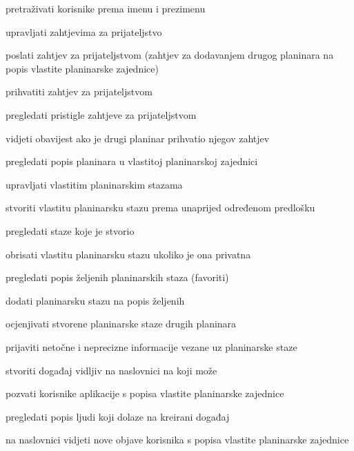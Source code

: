 \begin{packed_enum}
\begin{packed_enum}
\begin{packed_enum}
						\end{packed_enum}
					\item pretraživati korisnike prema imenu i prezimenu
					\item upravljati zahtjevima za prijateljstvo
					
						\begin{packed_enum}
							\item poslati zahtjev za prijateljstvom (zahtjev za dodavanjem drugog planinara na popis vlastite planinarske zajednice)
							\item prihvatiti zahtjev za prijateljstvom
							\item pregledati pristigle zahtjeve za prijateljstvom
							\item vidjeti obavijest ako je drugi planinar prihvatio njegov zahtjev
						\end{packed_enum}
					
					\item pregledati popis planinara u vlastitoj planinarskoj zajednici
					\item upravljati vlastitim planinarskim stazama
					\begin{packed_enum}
						\item stvoriti vlastitu planinarsku stazu prema unaprijed određenom predlošku
						\item pregledati staze koje je stvorio
						\item obrisati vlastitu planinarsku stazu ukoliko je ona privatna
					\end{packed_enum}
					\item pregledati popis željenih planinarskih staza (favoriti)
					\item dodati planinarsku stazu na popis željenih
					\item ocjenjivati stvorene planinarske staze drugih planinara
					\item prijaviti netočne i neprecizne informacije vezane uz planinarske staze
					\item stvoriti događaj vidljiv na naslovnici na koji može
						\begin{packed_enum}
							
							\item  pozvati korisnike aplikacije s popisa vlastite planinarske zajednice 
							\item  pregledati popis ljudi koji dolaze na kreirani događaj
							
						\end{packed_enum}
					\item na naslovnici vidjeti nove objave korisnika s popisa vlastite planinarske zajednice
						\begin{packed_enum}
					

\end{packed_enum}
\end{packed_enum}
\end{packed_enum}
